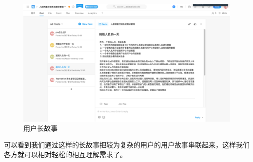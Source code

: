 \documentclass{ctexrep}
\begin{document}
\begin{figure}[H]
	\centering
	\includegraphics[scale=0.24]{img/longStory.png}
	\caption{\label{fig:long_story} 用户长故事}
\end{figure}
可以看到我们通过这样的长故事把较为复杂的用户的用户故事串联起来，这样我们各方就可以相对轻松的相互理解需求了。
\end{document}
